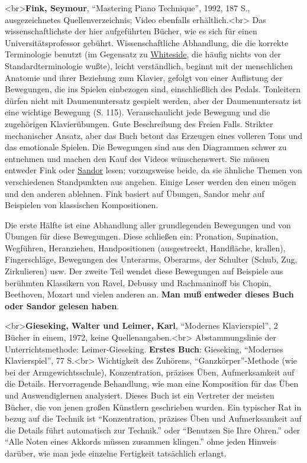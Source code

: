 <br>\textbf{Fink, Seymour}, \enquote{Mastering Piano Technique}, 1992, 187 S., ausgezeichnetes Quellenverzeichnis; Video ebenfalls erhältlich.<br>
Das wissenschaftlichste der hier aufgeführten Bücher, wie es sich für einen Universitätsprofessor gebührt.
Wissenschaftliche Abhandlung, die die korrekte Terminologie benutzt (im Gegensatz zu \hyperlink{Whiteside}{Whiteside}, die häufig nichts von der Standardterminologie wußte), leicht verständlich, beginnt mit der menschlichen Anatomie und ihrer Beziehung zum Klavier, gefolgt von einer Auflistung der Bewegungen, die ins Spielen einbezogen sind, einschließlich des Pedals.
Tonleitern dürfen nicht mit Daumenuntersatz gespielt werden, aber der Daumenuntersatz ist eine wichtige Bewegung (S. 115).
Veranschaulicht jede Bewegung und die zugehörigen Klavierübungen.
Gute Beschreibung des Freien Falls.
Strikter mechanischer Ansatz, aber das Buch betont das Erzeugen eines volleren Tons und das emotionale Spielen.
Die Bewegungen sind aus den Diagrammen schwer zu entnehmen und machen den Kauf des Videos wünschenswert.
Sie müssen entweder Fink oder \hyperlink{Sandor}{Sandor} lesen; vorzugsweise beide, da sie ähnliche Themen von verschiedenen Standpunkten aus angehen.
Einige Leser werden den einen mögen und den anderen ablehnen.
Fink basiert auf Übungen, Sandor mehr auf Beispielen von klassischen Kompositionen.

Die erste Hälfte ist eine Abhandlung aller grundlegenden Bewegungen und von Übungen für diese Bewegungen.
Diese schließen ein: Pronation, Supination, Wegführen, Heranziehen, Handpositionen (ausgestreckt, Handfläche, krallen), Fingerschläge, Bewegungen des Unterarms, Oberarms, der Schulter (Schub, Zug, Zirkulieren) usw.
Der zweite Teil wendet diese Bewegungen auf Beispiele aus berühmten Klassikern von Ravel, Debussy und Rachmaninoff bis Chopin, Beethoven, Mozart und vielen anderen an. \textbf{Man muß entweder dieses Buch oder Sandor gelesen haben}.


\hypertarget{Gieseking}{}

<br>\textbf{Gieseking, Walter und Leimer, Karl}, \enquote{Modernes Klavierspiel}, 2 Bücher in einem, 1972, keine Quellenangaben.<br>
Abstammungslinie der Unterrichtsmethode: Leimer-Gieseking.
\textbf{Erstes Buch}: Gieseking, \enquote{Modernes Klavierspiel}, 77 S.<br>
Wichtigkeit des Zuhörens, \enquote{Ganzkörper}-Methode (wie bei der Armgewichtsschule), Konzentration, präzises Üben, Aufmerksamkeit auf die Details.
Hervorragende Behandlung, wie man eine Komposition für das Üben und Auswendiglernen analysiert.
Dieses Buch ist ein Vertreter der meisten Bücher, die von jenen großen Künstlern geschrieben wurden.
Ein typischer Rat in bezug auf die Technik ist \enquote{Konzentration, präzises Üben und Aufmerksamkeit auf die Details führt automatisch zur Technik.} oder \enquote{Benutzen Sie Ihre Ohren.} oder \enquote{Alle Noten eines Akkords müssen zusammen klingen.} ohne jeden Hinweis darüber, wie man jede einzelne Fertigkeit tatsächlich erlangt.

